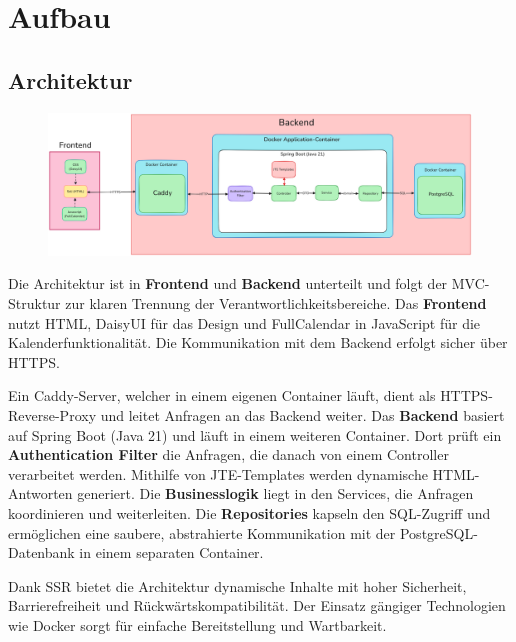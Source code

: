
\chapter{Aufbau}
\label{ch:aufbau}

\section{Architektur}
\begin{figure}[ht]
    \centering
    \includegraphics[width=\textwidth]{figures/architecture}
    \label{fig:architekturmodell}
\end{figure}
Die Architektur ist in \textbf{Frontend} und \textbf{Backend} unterteilt und folgt der \gls{MVC-Struktur} zur klaren Trennung der Verantwortlichkeitsbereiche.
Das \textbf{Frontend} nutzt \gls{HTML}, \gls{DaisyUI} für das Design und \gls{FullCalendar} in \gls{JavaScript} für die Kalenderfunktionalität.
Die Kommunikation mit dem Backend erfolgt sicher über \gls{HTTPS}.

Ein \gls{Caddy-Server}, welcher in einem eigenen \gls{Container} läuft, dient als \gls{HTTPS-Reverse-Proxy} und leitet Anfragen an das Backend weiter.
Das \textbf{Backend} basiert auf \gls{Spring Boot} (Java 21) und läuft in einem weiteren \gls{Container}.
Dort prüft ein \textbf{Authentication Filter} die Anfragen, die danach von einem \gls{Controller} verarbeitet werden.
Mithilfe von \gls{JTE}-Templates werden dynamische HTML-Antworten generiert.
Die \textbf{Businesslogik} liegt in den \gls{Services}, die Anfragen koordinieren und weiterleiten.
Die \textbf{Repositories} kapseln den SQL-Zugriff und ermöglichen eine saubere, abstrahierte Kommunikation
mit der \gls{PostgreSQL}-Datenbank in einem separaten \gls{Container}.

Dank \gls{SSR} bietet die Architektur dynamische Inhalte mit hoher Sicherheit, Barrierefreiheit und Rückwärtskompatibilität.
Der Einsatz gängiger Technologien wie \gls{Docker} sorgt für einfache Bereitstellung und Wartbarkeit.
\clearpage

